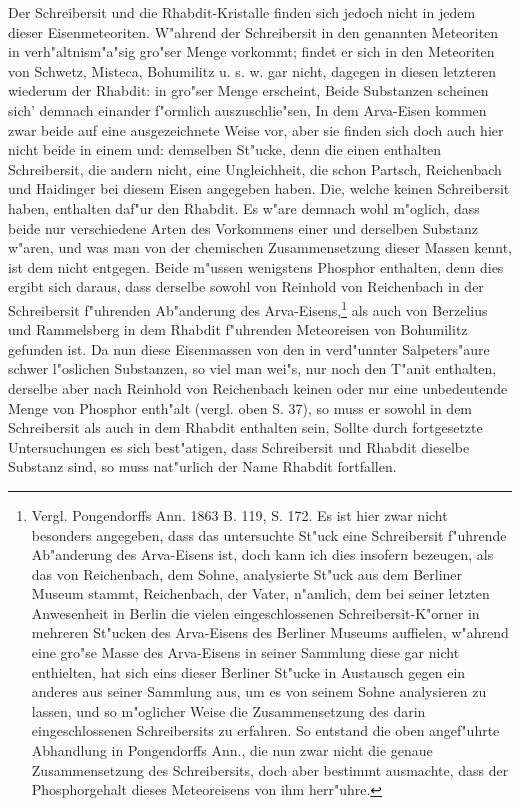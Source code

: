\documentclass[a4paper, 11pt, oneside]{article}
\begin{document}
Der Schreibersit und die Rhabdit-Kristalle finden sich jedoch nicht in jedem dieser Eisenmeteoriten. W"ahrend der Schreibersit in den genannten Meteoriten in verh"altnism"a"sig gro"ser Menge vorkommt; findet er sich in den Meteoriten von Schwetz, Misteca, Bohumilitz u. s. w. gar nicht, dagegen in diesen letzteren wiederum der Rhabdit: in gro"ser Menge erscheint, Beide Substanzen scheinen sich’ demnach einander f"ormlich auszuschlie"sen, In dem Arva-Eisen kommen zwar beide auf eine ausgezeichnete Weise vor, aber sie finden sich doch auch hier nicht beide in einem und: demselben St"ucke, denn die einen enthalten Schreibersit, die andern nicht, eine Ungleichheit, die schon Partsch, Reichenbach und Haidinger bei diesem Eisen angegeben haben. Die, welche keinen Schreibersit haben, enthalten daf"ur den Rhabdit. Es w"are demnach wohl m"oglich, dass beide nur verschiedene Arten des Vorkommens einer und derselben Substanz w"aren, und was man von der chemischen Zusammensetzung dieser Massen kennt, ist dem nicht entgegen. Beide m"ussen wenigstens Phosphor enthalten, denn dies ergibt sich daraus, dass derselbe sowohl von Reinhold von Reichenbach in der Schreibersit f"uhrenden Ab"anderung des Arva-Eisens,\footnote{Vergl. Pongendorffs Ann. 1863 B. 119, S. 172. Es ist hier zwar nicht besonders angegeben, dass das untersuchte St"uck eine Schreibersit f"uhrende Ab"anderung des Arva-Eisens ist, doch kann ich dies insofern bezeugen, als das von Reichenbach, dem Sohne, analysierte St"uck aus dem Berliner Museum stammt, Reichenbach, der Vater, n"amlich, dem bei seiner letzten Anwesenheit in Berlin die vielen eingeschlossenen Schreibersit-K"orner in mehreren St"ucken des Arva-Eisens des Berliner Museums auffielen, w"ahrend eine gro"se Masse des Arva-Eisens in seiner Sammlung diese gar nicht enthielten, hat sich eins dieser Berliner St"ucke in Austausch gegen ein anderes aus seiner Sammlung aus, um es von seinem Sohne analysieren zu lassen, und so m"oglicher Weise die Zusammensetzung des darin eingeschlossenen Schreibersits zu erfahren. So entstand die oben angef"uhrte Abhandlung in Pongendorffs Ann., die nun zwar nicht die genaue Zusammensetzung des Schreibersits, doch aber bestimmt ausmachte, dass der Phosphorgehalt dieses Meteoreisens von ihm herr"uhre.} als auch von Berzelius und Rammelsberg in dem Rhabdit f"uhrenden Meteoreisen von Bohumilitz gefunden ist. Da nun diese Eisenmassen von den in verd"unnter Salpeters"aure schwer l"oslichen Substanzen, so viel man wei"s, nur noch den T"anit enthalten, derselbe aber nach Reinhold von Reichenbach keinen oder nur eine unbedeutende Menge von Phosphor enth"alt (vergl. oben S. 37), so muss er sowohl in dem Schreibersit als auch in dem Rhabdit enthalten sein, Sollte durch fortgesetzte Untersuchungen es sich best"atigen, dass Schreibersit und Rhabdit dieselbe Substanz sind‚ so muss nat"urlich der Name Rhabdit fortfallen.
\end{document}
